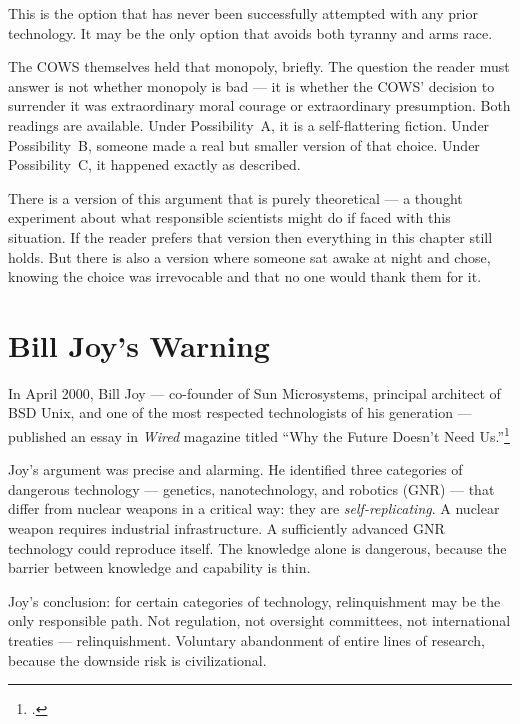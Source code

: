 This is the option that has never been successfully attempted with any prior technology. It may be the only option that avoids both tyranny and arms race.

The COWS themselves held that monopoly, briefly. The question the reader must answer is not whether monopoly is bad --- it is whether the COWS' decision to surrender it was extraordinary moral courage or extraordinary presumption. Both readings are available. Under Possibility~A, it is a self-flattering fiction. Under Possibility~B, someone made a real but smaller version of that choice. Under Possibility~C, it happened exactly as described.

There is a version of this argument that is purely theoretical --- a thought experiment about what responsible scientists might do if faced with this situation. If the reader prefers that version then everything in this chapter still holds. But there is also a version where someone sat awake at night and chose, knowing the choice was irrevocable and that no one would thank them for it.

\section*{Bill Joy's Warning}
\label{pos22:bill-joys-warning}

In April 2000, Bill Joy --- co-founder of Sun Microsystems, principal architect of BSD Unix, and one of the most respected technologists of his generation --- %
published an essay in \textit{Wired} magazine titled ``Why the Future Doesn't Need Us.''\footcite{joy2000}

Joy's argument was precise and alarming. He identified three categories of dangerous technology --- genetics, nanotechnology, and robotics (GNR) --- that differ from nuclear weapons in a critical way: they are \textit{self-replicating}. A nuclear weapon requires industrial infrastructure. A sufficiently advanced GNR technology could reproduce itself. The knowledge alone is dangerous, because the barrier between knowledge and capability is thin.

Joy's conclusion: for certain categories of technology, relinquishment may be the only responsible path. Not regulation, not oversight committees, not international treaties --- relinquishment. Voluntary abandonment of entire lines of research, because the downside risk is civilizational.

